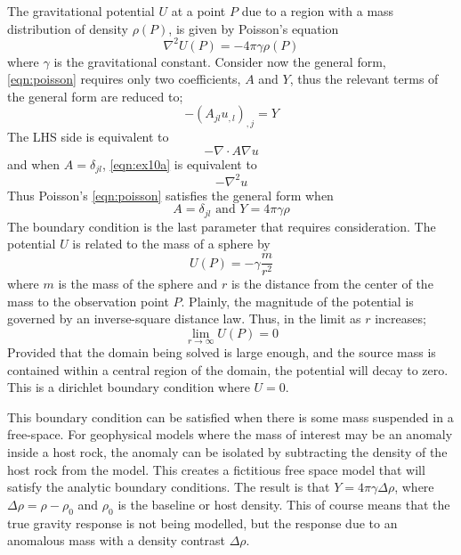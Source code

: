 The gravitational potential $U$ at a point $P$ due to a region with a mass
distribution of density $\rho(P)$, is given by Poisson's equation
\citep{Blakely1995}
\begin{equation} \label{eqn:poisson}
\nabla^2 U(P) = -4\pi\gamma\rho(P)
\end{equation}
where $\gamma$ is the gravitational constant.
Consider now the \esc general form, 
\autoref{eqn:poisson} requires only two coefficients,
$A$ and $Y$, thus the relevant terms of the general form are reduced to;
\begin{equation}
-\left(A_{jl} u_{,l} \right)_{,j} = Y
\end{equation}
The LHS side is equivalent to 
\begin{equation} \label{eqn:ex10a}
-\nabla \cdot A \nabla u
\end{equation}
and when $A=\delta_{jl}$, \autoref{eqn:ex10a} is equivalent to
\begin{equation*}
-\nabla^2 u
\end{equation*}
Thus Poisson's \autoref{eqn:poisson} satisfies the general form when
\begin{equation}
A=\delta_{jl} \text{ and } Y= 4\pi\gamma\rho
\end{equation}
The boundary condition is the last parameter that requires consideration. The
potential $U$ is related to the mass of a sphere by
\begin{equation}
U(P)=-\gamma \frac{m}{r^2}
\end{equation} where $m$ is the mass of the sphere and $r$ is the distance from
the center of the mass to the observation point $P$. Plainly, the magnitude
of the potential is governed by an inverse-square distance law. Thus, in the
limit as $r$ increases;
\begin{equation}
\lim_{r\to\infty} U(P) = 0
\end{equation}
Provided that the domain being solved is large enough, and the source mass is
contained within a central region of the domain, the potential will decay to
zero. This is a dirichlet boundary condition where $U=0$.

This boundary condition can be satisfied when there is some mass suspended in a
free-space. For geophysical models where the mass of interest may be an anomaly
inside a host rock, the anomaly can be isolated by subtracting the density of the
host rock from the model. This creates a fictitious free space model that will
satisfy the analytic boundary conditions. The result is that
$Y=4\pi\gamma\Delta\rho$, where $\Delta\rho=\rho-\rho_0$ and $\rho_0$ is the
baseline or host density. This of course means that the true gravity response is
not being modelled, but the response due to an anomalous mass with a
density contrast $\Delta\rho$.

